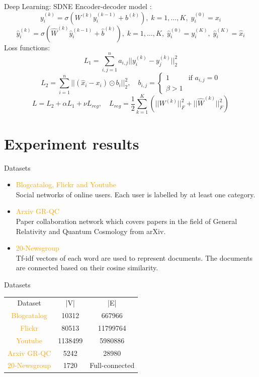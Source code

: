 \documentclass[10pt,aspectratio=169]{beamer}
\begin{document}
\begin{frame}[fragile]{Deep Learning: SDNE}
  Encoder-decoder model \cite{wang2016structural}:
    $$y_i^{(k)}=\sigma(W^{(k)}y_i^{(k-1)}+b^{(k)}), \; k=1,\ldots,K, \; y_i^{(0)}=x_i$$
    $$\hat{y}_i^{(k)}=\sigma(\hat{W}^{(k)}\hat{y}_i^{(k-1)}+\hat{b}^{(k)}), \; k=1,\ldots,K,
    \; \hat{y}_i^{(0)}=y_i^{(K)}, \; \hat{y}_i^{(K)}=\hat{x}_i$$
  \pause
  Loss functions:
    $$L_1=\sum_{i,j=1}^n a_{i,j} ||y_i^{(k)}-y_j^{(k)}||_2^2$$
    \pause
    $$L_2=\sum_{i=1}^n ||(\hat{x}_i-x_i) \odot b_i||_2^2, \quad b_{i,j}= 
    \begin{cases}
      1 & \text{if } a_{i,j}=0\\
      \beta > 1
    \end{cases}$$
    \pause
    $$L=L_2+\alpha L_1 + \nu L_{reg}, \quad L_{reg}=\frac{1}{2}\sum_{k=1}^K(||W^{(k)}||^2_F+||\hat{W}^{(k)}||^2_F)$$
\end{frame}


\section{Experiment results}

\begin{frame}[fragile]{Datasets}
  \begin{itemize}
    \item \textcolor{orange}{Blogcatalog, Flickr and Youtube}\\
      Social networks of online users. Each user is labelled by at least one category.
    \item \textcolor{orange}{Arxiv GR-QC}\\
      Paper collaboration network which covers papers in the field of General Relativity 
      and Quantum Cosmology from arXiv.
    \item \textcolor{orange}{20-Newsgroup}\\
      Tf-idf vectors of each word are used to represent documents. The documents are 
      connected based on their cosine similarity.
  \end{itemize}
\end{frame}

\begin{frame}[fragile]{Datasets}
  \begin{table}
    \begin{tabular}{ccc}
      Dataset & |V| & |E|\\
      \textcolor{orange}{Blogcatalog} & 10312 & 667966\\
      \textcolor{orange}{Flickr} & 80513 & 11799764\\
      \textcolor{orange}{Youtube} & 1138499 & 5980886\\
      \textcolor{orange}{Arxiv GR-QC} & 5242 & 28980\\
      \textcolor{orange}{20-Newsgroup} & 1720 & Full-connected
    \end{tabular}
  \end{table}
\end{frame}
\end{document}
